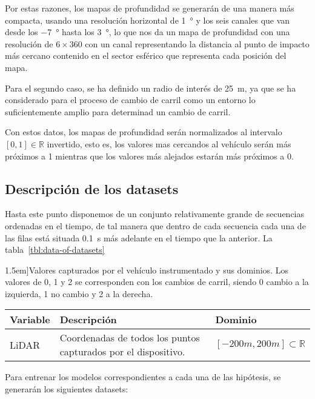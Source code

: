Por estas razones, los mapas de profundidad se generarán de una manera más compacta, usando una resolución horizontal de \SI{1}{\degree} y los seis canales que van desde los \SI{-7}{\degree} hasta los \SI{3}{\degree}, lo que nos da un mapa de profundidad con una resolución de $6 \times 360$ con un canal representando la distancia al punto de impacto más cercano contenido en el sector esférico que representa cada posición del mapa.

Para el segundo caso, se ha definido un radio de interés de \SI{25}{\meter}, ya que se ha considerado para el proceso de cambio de carril como un entorno lo suficientemente amplio para determinad un cambio de carril.

Con estos datos, los mapas de profundidad serán normalizados al intervalo $[0, 1] \in \mathbb{R}$ invertido, esto es, los valores mas cercandos al vehículo serán más próximos a 1 mientras que los valores más alejados estarán más próximos a 0.

\subsection{Descripción de los datasets}

Hasta este punto disponemos de un conjunto relativamente grande de secuencias ordenadas en el tiempo, de tal manera que dentro de cada secuencia cada una de las filas está situada \SI{0.1}{\second} más adelante en el tiempo que la anterior. La tabla~\ref{tbl:data-of-datasets}

\begin{table*}[t]
	\caption[Resúmen de información extraída del vehículo instrumentado][1.5em]{Valores capturados por el vehículo instrumentado y sus dominios. Los valores de 0, 1 y 2 se corresponden con los cambios de carril, siendo 0 cambio a la izquierda, 1 no cambio y 2 a la derecha.}
	\label{tbl:data-of-datasets}
	\begin{tabular}{lll}
		\toprule
		Variable & Descripción & Dominio \\
		\midrule
		LiDAR & Coordenadas de todos los puntos capturados por el dispositivo. & $[-200m, 200m] \subset \mathbb{R}$ \\
		\bottomrule
	\end{tabular}
\end{table*}

Para entrenar los modelos correspondientes a cada una de las hipótesis, se generarán los siguientes datasets:

